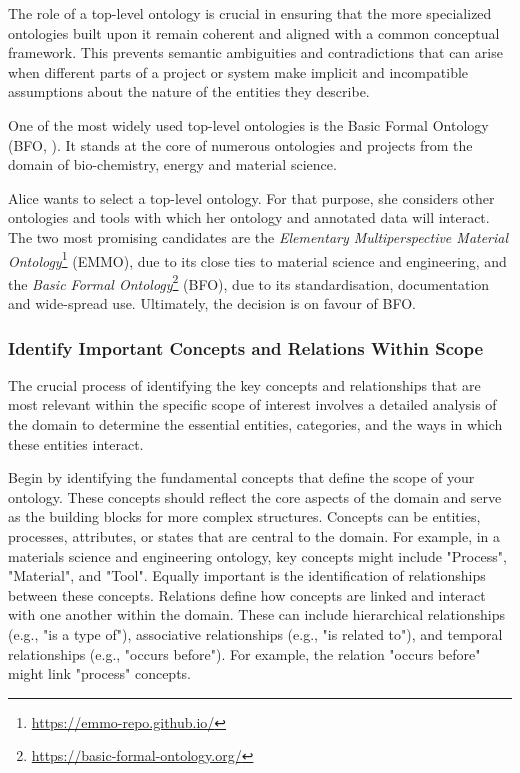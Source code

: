 The role of a top-level ontology is crucial in ensuring that the more specialized ontologies built upon it remain coherent and aligned with a common conceptual framework. This prevents semantic ambiguities and contradictions that can arise when different parts of a project or system make implicit and incompatible assumptions about the nature of the entities they describe.

One of the most widely used top-level ontologies is the Basic Formal Ontology (BFO, \cite{bfo-book}). It stands at the core of numerous ontologies and projects from the domain of bio-chemistry, energy and material science. 

\begin{example}
    Alice wants to select a top-level ontology. For that purpose, she considers other ontologies and tools with which her ontology and annotated data will interact. The two most promising candidates are the \textit{Elementary Multiperspective Material Ontology}\footnote{\url{https://emmo-repo.github.io/}} (EMMO), due to its close ties to material science and engineering, and the \textit{Basic Formal Ontology}\footnote{\url{https://basic-formal-ontology.org/}} (BFO), due to its standardisation, documentation and wide-spread use. Ultimately, the decision is on favour of BFO.
\end{example}

\subsubsection{Identify Important Concepts and Relations Within Scope}

The crucial process of identifying the key concepts and relationships that are most relevant within the specific scope of interest involves a detailed analysis of the domain to determine the essential entities, categories, and the ways in which these entities interact.

Begin by identifying the fundamental concepts that define the scope of your ontology. These concepts should reflect the core aspects of the domain and serve as the building blocks for more complex structures. Concepts can be entities, processes, attributes, or states that are central to the domain. For example, in a materials science and engineering ontology, key concepts might include "Process", "Material", and "Tool". Equally important is the identification of relationships between these concepts. Relations define how concepts are linked and interact with one another within the domain. These can include hierarchical relationships (e.g., "is a type of"), associative relationships (e.g., "is related to"), and temporal relationships (e.g., "occurs before"). For example, the relation "occurs before" might link "process" concepts.

